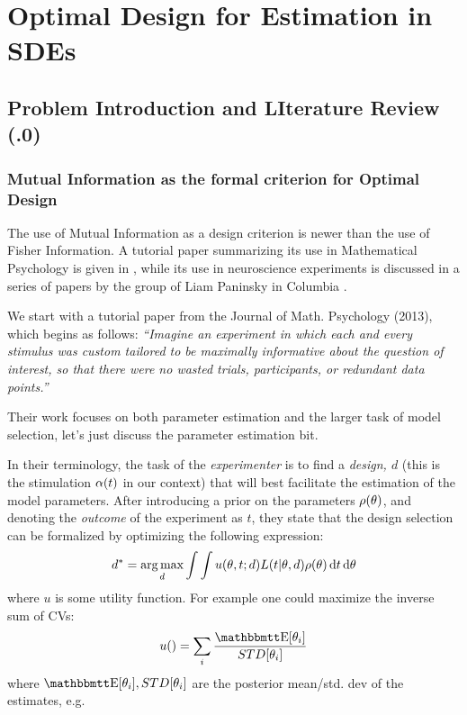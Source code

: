 \chapter{Optimal Design for Estimation in SDEs}
\label{ch:optimal_design}
\graphicspath{{../OptEstimate/}}


 
 \section{Problem Introduction and LIterature Review (.0)}
 

\subsection{Mutual Information as the formal criterion for Optimal Design}
The use of Mutual Information as a design criterion is newer than the use of
Fisher Information. A tutorial paper summarizing its use in Mathematical
Psychology is given in \cite{Myung2013}, while its use in neuroscience
experiments is discussed in a series of papers by the group of Liam Paninsky in
Columbia \cite{Paninski2003,Paninski2005,Lewi2009}. 




We start with a tutorial paper from the Journal of Math. Psychology (2013),
which begins as follows: { \sl ``Imagine an experiment in which each and every
stimulus was custom tailored to be maximally informative about the question of
interest, so that there were no wasted trials, participants, or redundant data
points.''} 

Their work focuses on both parameter estimation and the larger task of model
selection, let's just discuss the parameter estimation bit. 

In their terminology, the task of the {\sl experimenter}
 is to find a { \sl design, $d$ } (this is the stimulation $\alpha(t)$ in our
 context) that will best facilitate the estimation of the model parameters.
 After introducing a prior on the parameters $\rho({ \theta})$, and denoting the
 {\sl outcome} of the experiment as $t$, they state that the design selection
 can be formalized by optimizing the following expression: $$
d^* =  \argmax_d \int \int u(\th, t; d) L(t| \th, d) \rho (\th) \intd{t}
\intd{\th}
$$
where $u$ is some utility function. For example one could maximize the inverse
sum of CVs:
$$
u() = \sum_i \frac{\Exp[\th_i]}{STD[\th_i]}
$$
where 
$\Exp[\th_i], STD[\th_i]$ are the posterior mean/std. dev of the estimates, e.g.

